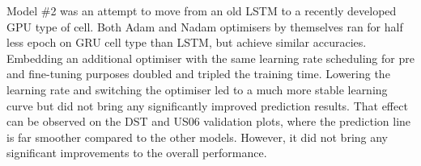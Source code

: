 %
%
Model \#2 was an attempt to move from an old LSTM to a recently developed GPU type of cell.
Both Adam and Nadam optimisers by themselves ran for half less epoch on GRU cell type than LSTM, but achieve similar accuracies.
Embedding an additional optimiser with the same learning rate scheduling for pre and fine-tuning purposes doubled and tripled the training time.
Lowering the learning rate and switching the optimiser led to a much more stable learning curve but did not bring any significantly improved prediction results.
That effect can be observed on the DST and US06 validation plots, where the prediction line is far smoother compared to the other models.
However, it did not bring any significant improvements to the overall performance.

